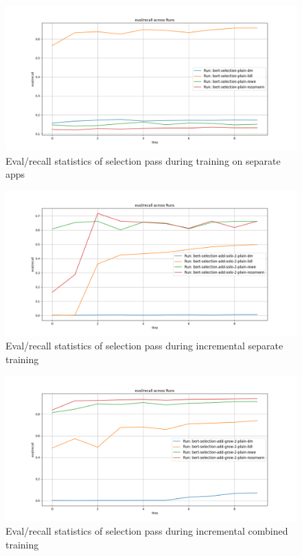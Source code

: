 \documentclass[licencjacka,en]{pracamgr}
\begin{document}
\begin{appendices}
\begin{figure}[h]
    \centering
    \includegraphics[width=0.8\linewidth]{bachelor_images/s_ers.png}
    \caption{Eval/recall statistics of selection pass during training on separate apps}
    \label{fig:s_ers}
\end{figure}

\begin{figure}[h]
    \centering
    \includegraphics[width=0.8\linewidth]{bachelor_images/s_eras.png}
    \caption{Eval/recall statistics of selection pass during incremental separate training}
    \label{fig:s_eras}
\end{figure}

\begin{figure}[h]
    \centering
    \includegraphics[width=0.8\linewidth]{bachelor_images/s_erag.png}
    \caption{Eval/recall statistics of selection pass during incremental combined training}
    \label{fig:s_erag}
\end{figure}


\end{appendices}
\end{document}
